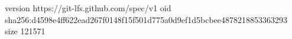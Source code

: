 version https://git-lfs.github.com/spec/v1
oid sha256:d4598e4ff622ead267f0148f15f501d775a0d9ef1d5bcbee4878218853363293
size 121571
